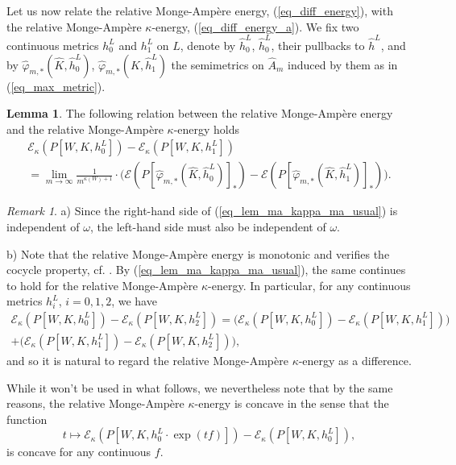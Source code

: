 \documentclass[12pt]{article}
\numberwithin{equation}{section}
\theoremstyle{theorem}
\theoremstyle{definition}
\newtheorem{lem}[thm]{Lemma}
\theoremstyle{remark}
\newtheorem{rem}[thm]{Remark}
\begin{document}
	\par 
	Let us now relate the relative Monge-Ampère energy, (\ref{eq_diff_energy}), with the relative Monge-Ampère $\kappa$-energy, (\ref{eq_diff_energy_a}).
	We fix two continuous metrics $h^L_0$ and $h^L_1$ on $L$, denote by $\widehat{h}^L_0$, $\widehat{h}^L_0$, their pullbacks to $\widehat{h}^L$, and by $\widehat{\varphi}_{m, *} (\widehat{K}, \widehat{h}^L_0)$, $\widehat{\varphi}_{m, *} (\widehat{K}, \widehat{h}^L_1)$ the semimetrics on $\widehat{A}_m$ induced by them as in (\ref{eq_max_metric}).
	\begin{lem}\label{lem_ma_kappa_ma_usual}
		The following relation between the relative Monge-Ampère energy and the relative Monge-Ampère $\kappa$-energy holds
		\begin{multline}\label{eq_lem_ma_kappa_ma_usual}
			\mathscr{E}_{\kappa}(P[W, K, h^L_0]) - \mathscr{E}_{\kappa}(P[W, K, h^L_1])
			\\
			=
			\lim_{m \to \infty}
			\frac{1}{m^{\kappa(W) + 1}}
			\cdot
			\Big(
			\mathscr{E}(P[\widehat{\varphi}_{m, *} (\widehat{K}, \widehat{h}^L_0)]_*) - \mathscr{E}(P[\widehat{\varphi}_{m, *} (\widehat{K}, \widehat{h}^L_1)]_*)
			\Big).
		\end{multline}
	\end{lem}
	\begin{rem}\label{rem_ma_kappa_ma_usual}
		a) Since the right-hand side of (\ref{eq_lem_ma_kappa_ma_usual}) is independent of $\omega$, the left-hand side must also be independent of $\omega$.
		\par 
		b) Note that the relative Monge-Ampère energy is monotonic and verifies the cocycle property, cf. \cite[Proposition 10.28]{GuedjZeriahBook}.
		By (\ref{eq_lem_ma_kappa_ma_usual}), the same continues to hold for the relative Monge-Ampère $\kappa$-energy.
		In particular, for any continuous metrics $h^L_i$, $i = 0, 1, 2$, we have
		\begin{multline}
			\mathscr{E}_{\kappa}(P[W, K, h^L_0]) - \mathscr{E}_{\kappa}(P[W, K, h^L_2])
			=
			\big(\mathscr{E}_{\kappa}(P[W, K, h^L_0]) - \mathscr{E}_{\kappa}(P[W, K, h^L_1])\big)
			\\
			+
			\big(\mathscr{E}_{\kappa}(P[W, K, h^L_1]) - \mathscr{E}_{\kappa}(P[W, K, h^L_2])\big),
		\end{multline}
		and so it is natural to regard the relative Monge-Ampère $\kappa$-energy as a difference.
		\par 
		While it won't be used in what follows, we nevertheless note that by the same reasons, the relative Monge-Ampère $\kappa$-energy is concave in the sense that the function 
		\begin{equation}
			t \mapsto \mathscr{E}_{\kappa}(P[W, K, h^L_0 \cdot \exp(tf) ]) - \mathscr{E}_{\kappa}(P[W, K, h^L_0]),
		\end{equation}
		is concave for any continuous $f$.
	\end{rem}
\end{document}
